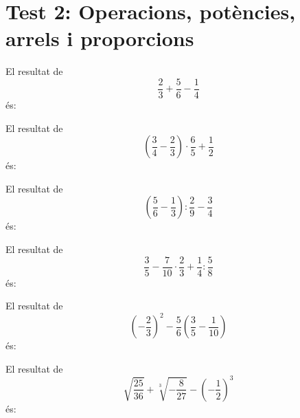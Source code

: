 \section{Test 2: Operacions, potències, arrels i proporcions}


\begin{enumerate}
\pregunta El resultat de
\[
	\frac{2}{3}+\frac{5}{6}-\frac{1}{4}
\]
és:
\begin{enumerate}
\end{enumerate}
\feedback

\pregunta El resultat de
\[
	\left(\frac{3}{4}-\frac{2}{3}\right)\cdot\frac{6}{5}+\frac{1}{2}
\]
és:
\begin{enumerate}
\end{enumerate}
\feedback

\pregunta El resultat de
\[
	\left(\frac{5}{6}-\frac{1}{3}\right):\frac{2}{9}-\frac{3}{4}
\]
és:
\begin{enumerate}
\end{enumerate}
\feedback

\pregunta El resultat de
\[
	\frac{3}{5}
	-
	\frac{7}{10}\cdot\frac{2}{3}
	+
	\frac{1}{4}:\frac{5}{8}
\]
és:
\begin{enumerate}
\end{enumerate}
\feedback

\pregunta El resultat de
\[
	\left(-\frac{2}{3}\right)^2
	-
	\frac{5}{6}\left(\frac{3}{5}-\frac{1}{10}\right)
\]
és:
\begin{enumerate}
\end{enumerate}
\feedback

\pregunta El resultat de
\[
	\sqrt{\frac{25}{36}}
	+
	\sqrt[3]{-\frac{8}{27}}
	-
	\left(-\frac{1}{2}\right)^3
\]
és:
\begin{enumerate}
\end{enumerate}
\feedback


\end{enumerate}
